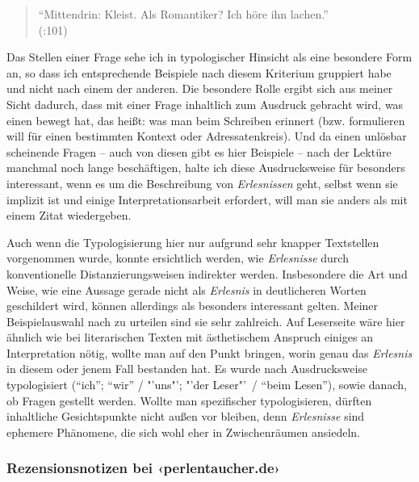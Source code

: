 \documentclass[fontsize=12pt]{scrartcl}
\begin{document}
\singlespacing
\begin{quote}
"`Mittendrin: Kleist. Als Romantiker? Ich h\"ore ihn lachen."'\\ (\cite{Draesner2013}:101)
\end{quote}
\onehalfspacing

Das Stellen einer Frage sehe ich in typologischer Hinsicht als eine besondere Form an, so dass ich entsprechende Beispiele nach diesem Kriterium gruppiert habe und nicht nach einem der anderen. Die besondere Rolle ergibt sich aus meiner Sicht dadurch, dass mit einer Frage inhaltlich zum Ausdruck gebracht wird, was einen bewegt hat, das hei{\ss}t: was man beim Schrei\-ben erinnert (bzw. formulieren will f\"ur einen bestimmten Kontext oder Adressaten\textsuperscript{\tiny *}kreis). Und da einen unl\"osbar scheinende Fragen -- auch von diesen gibt es \mbox{hier} Beispiele -- nach der Lekt\"ure manchmal noch lange besch\"aftigen, halte ich diese Ausdrucksweise f\"ur besonders interessant, wenn es um die Beschreibung von \textit{Erlesnissen} geht, \mbox{selbst} wenn sie implizit ist und einige Interpretationsarbeit erfordert, will man sie anders als mit einem Zitat wiedergeben.

Auch wenn die Typologisierung \mbox{hier} nur aufgrund sehr knapper Textstellen vor\-ge\-nom\-men wurde, konnte ersichtlich werden, wie \textit{Erlesnisse} durch konventionelle Distanzierungsweisen indirekter werden. Insbesondere die Art und Weise, wie eine Aussage gerade nicht als \textit{Erlesnis} in deutlicheren Worten geschildert wird, k\"onnen al\-ler\-dings als besonders interessant gelten. Meiner Beispielauswahl nach zu urteilen sind sie sehr zahlreich. Auf Leser\textsuperscript{\tiny *}seite w\"are \mbox{hier} \"ahnlich wie bei li\-te\-ra\-rischen Texten mit \"asthetischem Anspruch einiges an Interpretation n\"otig, wollte man auf den Punkt bringen, worin genau das \textit{Erlesnis} in diesem oder jenem Fall bestanden hat. Es wurde nach Ausdrucksweise typologisiert ("`ich"'; "`wir"' / "'uns"'; "'der \mbox{Leser\textsuperscript{\tiny *}"' /} "`beim Lesen"'), sowie danach, ob Fragen gestellt werden. Wollte man spezifischer typologisieren, d\"urften inhaltliche Gesichtspunkte nicht au{\ss}en vor bleiben, denn \textit{Erlesnisse} sind ephemere Ph\"anomene, die sich wohl eher in Zwi\-schen\-r\"au\-men ansiedeln. 

\pagebreak
\subsubsection{Rezensionsnotizen bei ‹perlentaucher.de›}
\label{subsubsec:7.1.2}
\end{document}
